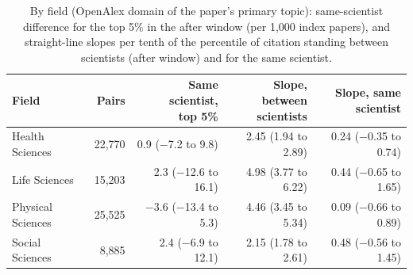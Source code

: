 \begin{table}[H]
\centering\small
\caption{By field (OpenAlex domain of the paper's primary topic): same-scientist difference for the top 5\% in the after window (per 1,000 index papers), and straight-line slopes per tenth of the percentile of citation standing between scientists (after window) and for the same scientist.}\label{tab:s_fields}
\footnotesize
\begin{tabularx}{\linewidth}{>{\raggedright\arraybackslash}Xrrrr}
\toprule
Field & Pairs & \makecell[rb]{Same\\scientist,\\top 5\%} & \makecell[rb]{Slope,\\between\\scientists} & \makecell[rb]{Slope, same\\scientist} \\
\midrule
Health Sciences & 22,770 & 0.9 ($-$7.2 to 9.8) & 2.45 (1.94 to 2.89) & 0.24 ($-$0.35 to 0.74) \\
Life Sciences & 15,203 & 2.3 ($-$12.6 to 16.1) & 4.98 (3.77 to 6.22) & 0.44 ($-$0.65 to 1.65) \\
Physical Sciences & 25,525 & $-$3.6 ($-$13.4 to 5.3) & 4.46 (3.45 to 5.34) & 0.09 ($-$0.66 to 0.89) \\
Social Sciences & 8,885 & 2.4 ($-$6.9 to 12.1) & 2.15 (1.78 to 2.61) & 0.48 ($-$0.56 to 1.45) \\
\bottomrule
\end{tabularx}
\end{table}

